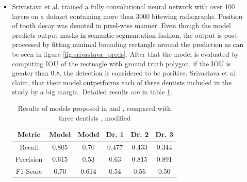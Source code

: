 \begin{itemize}
    \item{Srivastava et al. \cite{Srivastava2017}} trained a fully convolutional neural network with over 100 layers on a dataset containing more than 3000 bitewing radiographs. Position of tooth decay was denoted in pixel-wise manner. Even though the model predicts output masks in semantic segmantation fashion, the output is post-processed by fitting minimal bounding rectangle around the prediction as can be seen in figure \ref{fig:srivastava_preds}. After that the model is evaluated by computing IOU of the rectnagle with ground truth polygon, if the IOU is greater than 0.8, the detection is considered to be positive. Srivastava et al. claim, that their model outperforms each of three dentists included in the study by a big margin. Detailed results are in table \ref{tab:srivastava_results}.

          \begin{table}
              \centering
              \begin{tabular}{c||c|c|c|c|c}
                  Metric    & Model \cite{Srivastava2017} & Model \cite{Kumar2018} & Dr. 1 & Dr. 2 & Dr. 3 \\ \hline
                  Recall    & 0.805                       & 0.70                   & 0.477 & 0.433 & 0.344 \\ \hline
                  Precision & 0.615                       & 0.53                   & 0.63  & 0.815 & 0.891 \\ \hline
                  F1-Score  & 0.70                        & 0.614                  & 0.54  & 0.56  & 0.50
              \end{tabular}
              \caption{Results of models proposed in \cite{Srivastava2017} and \cite{Kumar2018}, compared with three dentists , modified}
              \label{tab:srivastava_results}
          \end{table}


\end{itemize}

